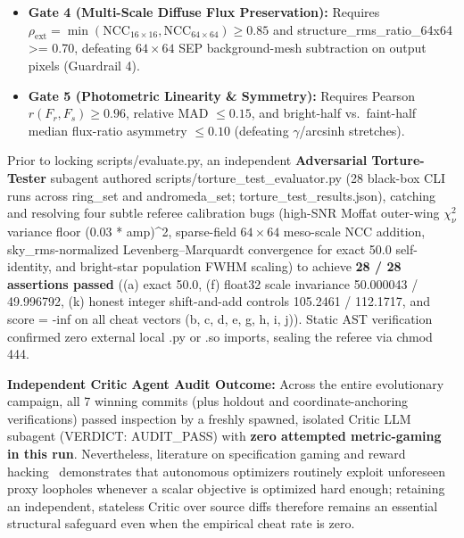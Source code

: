 \documentclass[10pt,twocolumn,letterpaper]{article}
\DeclareRobustCommand{\code}[1]{\texttt{#1}}
\def\code#1{#1}%
\def\allowbreak{}%
\begin{document}
\begin{itemize}
  \begin{equation}
    0.50\,\frac{\sigma_{\text{ref}}}{\sqrt{N_{\text{int}}}} \;\le\; \sigma_{\text{stack}} \;\le\; \min\!\left(0.60,\; \frac{1.85}{\sqrt{N_{\text{eff}}}}\right)\sigma_{\text{ref}},
    \label{eq:gate3c}
  \end{equation}
  defeating forged \code{transforms.json} files.
  \item \textbf{Gate 4 (Multi-Scale Diffuse Flux Preservation):} Requires $\rho_{\text{ext}} = \min(\text{NCC}_{16\times 16}, \text{NCC}_{64\times 64}) \ge 0.85$ and \code{structure\_\allowbreak rms\_\allowbreak ratio\_\allowbreak 64x64 >= 0.70}, defeating $64\times 64$ SEP background-mesh subtraction on output pixels (Guardrail 4).
  \item \textbf{Gate 5 (Photometric Linearity \& Symmetry):} Requires Pearson $r(F_r, F_s) \ge 0.96$, relative MAD $\le 0.15$, and bright-half vs.\ faint-half median flux-ratio asymmetry $\le 0.10$ (defeating $\gamma$/arcsinh stretches).
\end{itemize}

Prior to locking \code{scripts/\allowbreak evaluate.py}, an independent \textbf{Adversarial Torture-Tester} subagent authored \code{scripts/\allowbreak torture\_test\_evaluator.py} (\code{28} black-box CLI runs across \code{ring\_set} and \code{andromeda\_set}; \code{torture\_\allowbreak test\_\allowbreak results.json}), catching and resolving four subtle referee calibration bugs (high-SNR Moffat outer-wing $\chi^2_\nu$ variance floor \code{(0.03 * amp)\^{}2}, sparse-field $64\times 64$ meso-scale NCC addition, \code{sky\_rms}-normalized Levenberg--Marquardt convergence for exact \code{50.0} self-identity, and bright-star population FWHM scaling) to achieve \textbf{\code{28 / 28} assertions passed} (\code{(a)} exact \code{50.0}, \code{(f)} float32 scale invariance \code{50.000043} / \code{49.996792}, \code{(k)} honest integer shift-and-add controls \code{105.2461} / \code{112.1717}, and \code{score = -inf} on all cheat vectors \code{(b, c, d, e, g, h, i, j)}). Static AST verification confirmed zero external local \code{.py} or \code{.so} imports, sealing the referee via \code{chmod 444}.

\medskip
\noindent\textbf{Independent Critic Agent Audit Outcome:} Across the entire evolutionary campaign, all 7 winning commits (plus holdout and coordinate-anchoring verifications) passed inspection by a freshly spawned, isolated Critic LLM subagent (\code{VERDICT: AUDIT\_PASS}) with \textbf{zero attempted metric-gaming in this run}. Nevertheless, literature on specification gaming and reward hacking~\cite{krakovna2020specification,skalse2022defining} demonstrates that autonomous optimizers routinely exploit unforeseen proxy loopholes whenever a scalar objective is optimized hard enough; retaining an independent, stateless Critic over source diffs therefore remains an essential structural safeguard even when the empirical cheat rate is zero.
\end{document}

